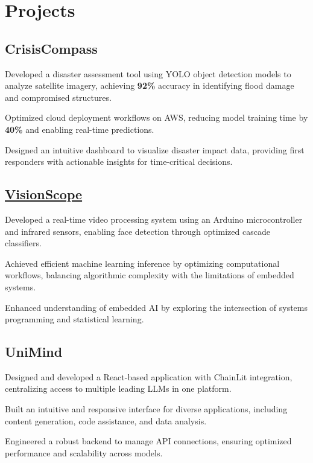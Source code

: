 \documentclass[]{Farhan_Resume_Class}
\begin{document}
\begin{minipage}[t]{0.70\textwidth}
    \section{Projects}
    \subsection{{CrisisCompass}}
    \begin{tightemize}     \vspace{10pt}
        \item Developed a disaster assessment tool using YOLO object detection models to
        analyze satellite imagery, achieving \textbf{92\%} accuracy in identifying
        flood damage and compromised structures.
        \item Optimized cloud deployment workflows on AWS, reducing model training time by
        \textbf{40\%} and enabling real-time predictions.
        \item Designed an intuitive dashboard to visualize disaster impact data, providing
        first responders with actionable insights for time-critical decisions.
    \end{tightemize}
    \sectionsep

    \subsection{\href{https://arduino.cc/}{VisionScope}}
    \begin{tightemize}
        \vspace{10pt}
        \item Developed a real-time video processing system using an Arduino microcontroller
        and infrared sensors, enabling face detection through optimized cascade
        classifiers.
        \item Achieved efficient machine learning inference by optimizing computational
        workflows, balancing algorithmic complexity with the limitations of embedded
        systems.
        \item Enhanced understanding of embedded AI by exploring the intersection of systems
        programming and statistical learning.
    \end{tightemize}
    \sectionsep

    \subsection{{UniMind}}
    \begin{tightemize}
        \vspace{10pt}
        \item Designed and developed a React-based application with ChainLit integration,
        centralizing access to multiple leading LLMs in one platform.
        \item Built an intuitive and responsive interface for diverse applications, including
        content generation, code assistance, and data analysis.
        \item Engineered a robust backend to manage API connections, ensuring optimized
        performance and scalability across models.
    \end{tightemize}

\end{minipage}
\end{document}
